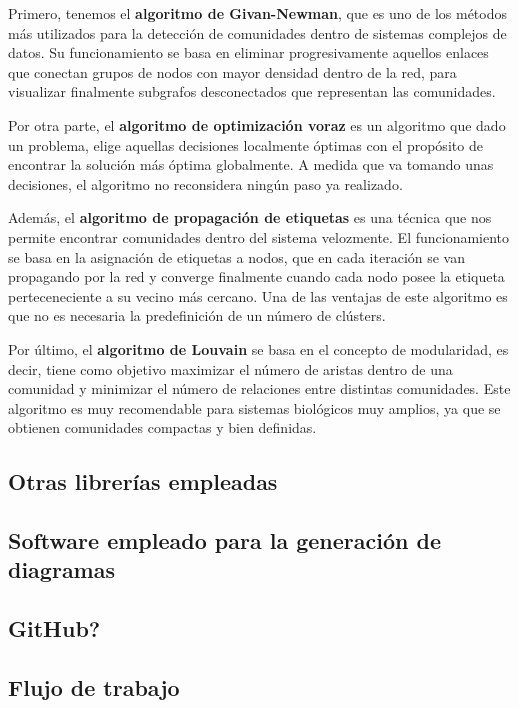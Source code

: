 Primero, tenemos el \textbf{algoritmo de Givan-Newman}, que es uno de los métodos más utilizados para la detección de comunidades dentro de sistemas complejos de datos. Su funcionamiento se basa en eliminar progresivamente aquellos enlaces que conectan grupos de nodos con mayor densidad dentro de la red, para visualizar finalmente subgrafos desconectados que representan las comunidades.

Por otra parte, el \textbf{algoritmo de optimización voraz} es un algoritmo que dado un problema, elige aquellas decisiones localmente óptimas con el propósito de encontrar la solución más óptima globalmente. A medida que va tomando unas decisiones, el algoritmo no reconsidera ningún paso ya realizado.

Además, el \textbf{algoritmo de propagación de etiquetas} es una técnica que nos permite encontrar comunidades dentro del sistema velozmente. El funcionamiento se basa en la asignación de etiquetas a nodos, que en cada iteración se van propagando por la red y converge finalmente cuando cada nodo posee la etiqueta perteceneciente a su vecino más cercano. Una de las ventajas de este algoritmo es que no es necesaria la predefinición de un número de clústers.

Por último, el \textbf{algoritmo de Louvain} se basa en el concepto de modularidad, es decir, tiene como objetivo maximizar el número de aristas dentro de una comunidad y minimizar el número de relaciones entre distintas comunidades. Este algoritmo es muy recomendable para sistemas biológicos muy amplios, ya que se obtienen comunidades compactas y bien definidas.

\subsection{Otras librerías empleadas}

\subsection{Software empleado para la generación de diagramas}

\subsection{GitHub?}

\subsection{Flujo de trabajo}

